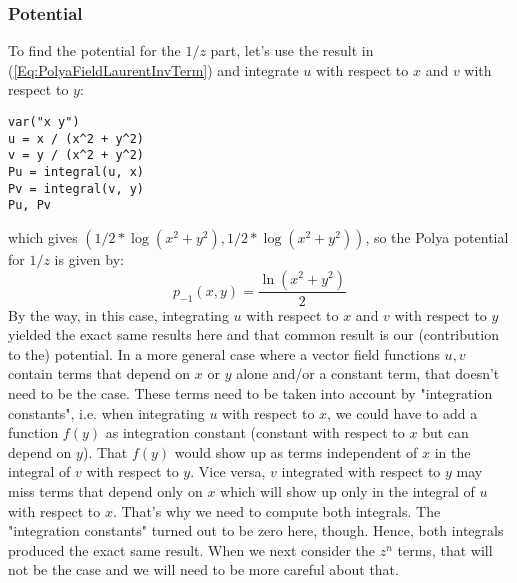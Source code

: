 \documentclass[12pt]{article}
\begin{document}
\subsubsection{Potential}
To find the potential for the $1/z$ part, let's use the result in (\ref{Eq:PolyaFieldLaurentInvTerm}) and integrate $u$ with respect to $x$ and $v$ with respect to $y$:  
\begin{verbatim}
var("x y")  
u = x / (x^2 + y^2)
v = y / (x^2 + y^2)
Pu = integral(u, x)
Pv = integral(v, y)
Pu, Pv
\end{verbatim}
which gives $(1/2*\log(x^2 + y^2), 1/2*\log(x^2 + y^2))$, so the Polya potential for $1/z$ is given by:
\begin{equation}
\label{Eq:PolyaPotentialLaurentInvTerm}	%
\boxed{p_{-1}(x,y) = \frac{\ln(x^2 + y^2)}{2}}
\end{equation}
By the way, in this case, integrating $u$ with respect to $x$ and $v$ with respect to $y$ yielded the exact same results here and that common result is our (contribution to the) potential. In a more general case where a vector field functions $u,v$ contain terms that depend on $x$ or $y$ alone and/or a constant term, that doesn't need to be the case. These terms need to be taken into account by "integration constants", i.e. when integrating $u$ with respect to $x$, we could have to add a function $f(y)$ as integration constant (constant with respect to $x$ but can depend on $y$). That $f(y)$ would show up as terms independent of $x$ in the integral of $v$ with respect to $y$. Vice versa, $v$ integrated with respect to $y$ may miss terms that depend only on $x$ which will show up only in the integral of $u$ with respect to $x$. That's why we need to compute both integrals. The "integration constants" turned out to be zero here, though. Hence, both integrals produced the exact same result. When we next consider the $z^n$ terms, that will not be the case and we will need to be more careful about that.
\end{document}

